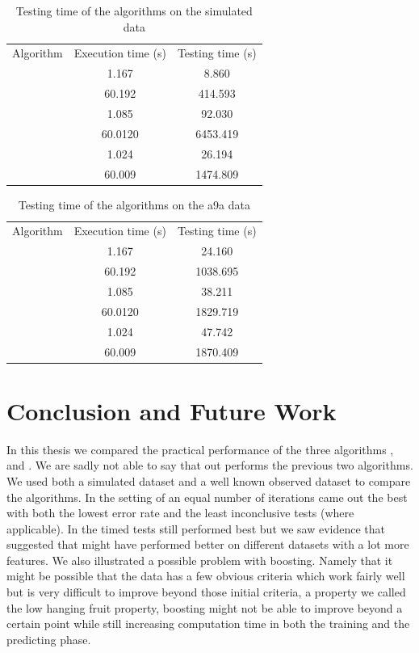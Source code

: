 \begin{table}[htbp]
\centering
\begin{tabular}{|c|c|c|}
\hline
Algorithm & Execution time (s) & Testing time (s)  \\ \hhline{|=|=|=|}
\multirow{ 2}{*}{\adaB} & 1.167 & 8.860 \\\cline{2-3}
& 60.192 & 414.593  \\ \Xhline{1pt}
\multirow{ 2}{*}{\NHB} & 1.085 & 92.030 \\\cline{2-3}
& 60.0120 & 6453.419  \\ \Xhline{1pt}
\multirow{ 2}{*}{\squintB} & 1.024 & 26.194\\\cline{2-3}
 & 60.009 & 1474.809\\ \hline
\end{tabular}
\caption{Testing time of the algorithms on the simulated data}
\label{tbl:GDTestingTime}
\end{table}

\begin{table}[htbp]
\centering
\begin{tabular}{|c|c|c|}
\hline
Algorithm & Execution time (s) & Testing time (s)  \\ \hhline{|=|=|=|}
\multirow{ 2}{*}{\adaB} & 1.167 & 24.160 \\\cline{2-3}
& 60.192 & 1038.695  \\ \Xhline{1pt}
\multirow{ 2}{*}{\NHB} & 1.085 & 38.211 \\\cline{2-3}
& 60.0120 & 1829.719  \\ \Xhline{1pt}
\multirow{ 2}{*}{\squintB} & 1.024 & 47.742\\\cline{2-3}
 & 60.009 & 1870.409\\ \hline
\end{tabular}
\caption{Testing time of the algorithms on the a9a data}
\label{tbl:SVMTestingTime}
\end{table}
\FloatBarrier
 
\section{Conclusion and Future Work} 
\label{sec:Concl}

In this thesis we compared the practical performance of the three algorithms \adaB, \NHB and \squintB. We are sadly not able to say that \squintB out performs the previous two algorithms. We used both a simulated dataset and a well known observed dataset to compare the algorithms. In the setting of an equal number of iterations \NHB came out the best with both the lowest error rate and the least inconclusive tests (where applicable). In the timed tests \NHB still performed best but we saw evidence that suggested that \squintB might have performed better on different datasets with a lot more features. We also illustrated a possible problem with boosting. Namely that it might be possible that the data has a few obvious criteria which work fairly well but is very difficult to improve beyond those initial criteria, a property we called the low hanging fruit property, boosting might not be able to improve beyond a certain point while still increasing computation time in both the training and the predicting phase. 

